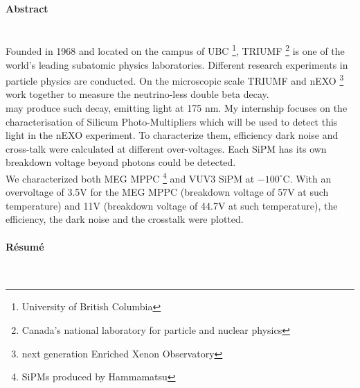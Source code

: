 \documentclass[a4paper, 11pt]{report}%
\begin{document}
\newpage
\thispagestyle{empty}

\paragraph{Abstract}\hspace{0.5cm}\\
  
  Founded in 1968 and located on the campus of UBC \footnote{University of British Columbia}, TRIUMF \footnote{Canada's national laboratory 
  for particle and nuclear physics} is one of the world’s leading subatomic physics laboratories. Different research experiments in particle physics
  are conducted. On the microscopic scale TRIUMF and nEXO \footnote{next generation Enriched Xenon Observatory} work together to measure 
  the neutrino-less double beta decay. 
  \\
   may produce such decay, emitting light at 175 nm. My internship focuses on the characterisation of Silicum Photo-Multipliers which will be 
  used to detect this light in the nEXO experiment. To characterize them, efficiency dark noise and cross-talk were calculated
  at different over-voltages. Each SiPM has its own breakdown voltage beyond photons could be detected. 
  \\
  We characterized both MEG MPPC \footnote{SiPMs produced by Hammamatsu} and VUV3 SiPM at $-100^\circ$C. With an overvoltage of 3.5V for the MEG MPPC (breakdown 
  voltage of 57V at such temperature) and 11V (breakdown voltage of 44.7V at such temperature), the efficiency, the dark noise and the crosstalk were plotted. 

\paragraph{R\'esum\'e}\hspace{0.5cm}\\
   
\end{document}
